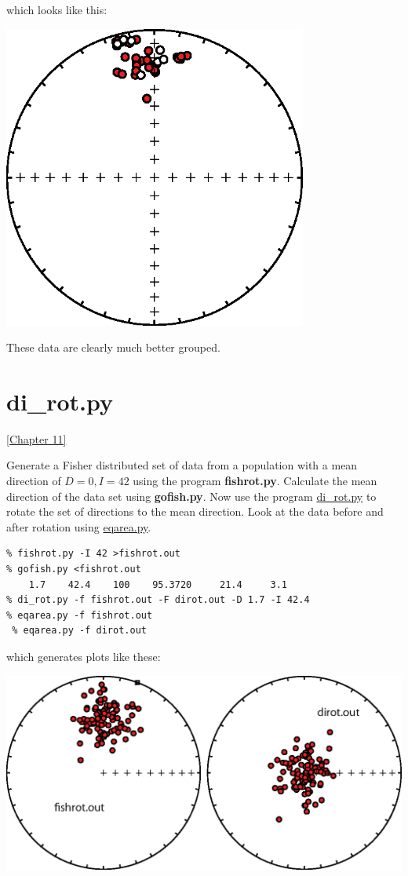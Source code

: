 \documentclass[11pt]{book}
\begin{document}
{{{{{\begin{verbatim}
\end{verbatim}

\noindent which looks like this:

  \includegraphics[width=10cm]{EPSfiles/di_geo_geo_eq.eps}
  
  \noindent These data are clearly much better grouped.  



\section{di\_rot.py}
\href{http://Webbook2.html/#Fisher_statitstics}{ [Chapter  11]}


Generate a Fisher distributed set of data from a population with a mean direction of $D=0, I=42$ using the program {\bf fishrot.py}.  Calculate the mean direction of the data set using {\bf gofish.py}.  Now use the program \href{#di_rot.py}{di\_rot.py} to rotate the set of directions to the mean direction.  Look at the data before and after rotation using \href{#eqarea.py}{eqarea.py}.  

\begin{verbatim}
% fishrot.py -I 42 >fishrot.out
% gofish.py <fishrot.out
    1.7    42.4    100    95.3720     21.4     3.1
% di_rot.py -f fishrot.out -F dirot.out -D 1.7 -I 42.4
% eqarea.py -f fishrot.out
 % eqarea.py -f dirot.out
\end{verbatim}

\noindent  which generates plots like these:

\includegraphics[width=15 cm]{EPSfiles/dirot.eps}}

}}}}
\end{document}
